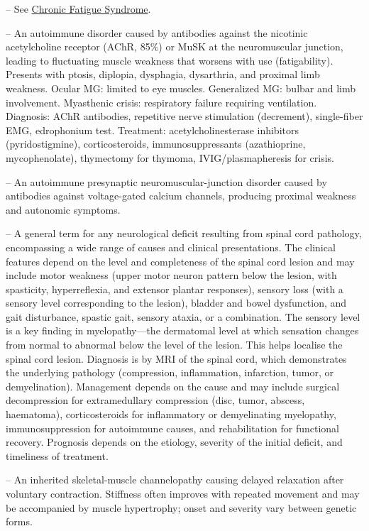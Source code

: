 -- See \hyperlink{Chronic Fatigue Syndrome}{Chronic Fatigue Syndrome}.

-- An autoimmune disorder caused by antibodies against the nicotinic acetylcholine receptor (AChR, 85\%) or MuSK at the neuromuscular junction, leading to fluctuating muscle weakness that worsens with use (fatigability). Presents with ptosis, diplopia, dysphagia, dysarthria, and proximal limb weakness. Ocular MG: limited to eye muscles. Generalized MG: bulbar and limb involvement. Myasthenic crisis: respiratory failure requiring ventilation. Diagnosis: AChR antibodies, repetitive nerve stimulation (decrement), single-fiber EMG, edrophonium test. Treatment: acetylcholinesterase inhibitors (pyridostigmine), corticosteroids, immunosuppressants (azathioprine, mycophenolate), thymectomy for thymoma, IVIG/plasmapheresis for crisis.

-- An autoimmune presynaptic neuromuscular-junction disorder caused by antibodies against voltage-gated calcium channels, producing proximal weakness and autonomic symptoms.

-- A general term for any neurological deficit resulting from spinal cord pathology, encompassing a wide range of causes and clinical presentations. The clinical features depend on the level and completeness of the spinal cord lesion and may include motor weakness (upper motor neuron pattern below the lesion, with spasticity, hyperreflexia, and extensor plantar responses), sensory loss (with a sensory level corresponding to the lesion), bladder and bowel dysfunction, and gait disturbance, spastic gait, sensory ataxia, or a combination. The sensory level is a key finding in myelopathy—the dermatomal level at which sensation changes from normal to abnormal below the level of the lesion. This helps localise the spinal cord lesion. Diagnosis is by MRI of the spinal cord, which demonstrates the underlying pathology (compression, inflammation, infarction, tumor, or demyelination). Management depends on the cause and may include surgical decompression for extramedullary compression (disc, tumor, abscess, haematoma), corticosteroids for inflammatory or demyelinating myelopathy, immunosuppression for autoimmune causes, and rehabilitation for functional recovery. Prognosis depends on the etiology, severity of the initial deficit, and timeliness of treatment.

-- An inherited skeletal-muscle channelopathy causing delayed relaxation after voluntary contraction. Stiffness often improves with repeated movement and may be accompanied by muscle hypertrophy; onset and severity vary between genetic forms.

